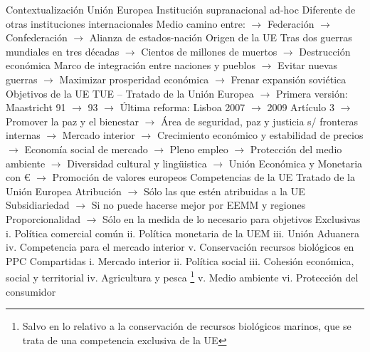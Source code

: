 \documentclass{nuevotema}
\begin{document}
\esquemalargo















\begin{esquemal}
	\1[] 
		\2 Contextualización
			\3 Unión Europea
				\4 Institución supranacional ad-hoc
				\4[] Diferente de otras instituciones internacionales
				\4[] Medio camino entre:
				\4[] $\to$ Federación
				\4[] $\to$ Confederación
				\4[] $\to$ Alianza de estados-nación
				\4 Origen de la UE
				\4[] Tras dos guerras mundiales en tres décadas
				\4[] $\to$ Cientos de millones de muertos
				\4[] $\to$ Destrucción económica
				\4[] Marco de integración entre naciones y pueblos
				\4[] $\to$ Evitar nuevas guerras
				\4[] $\to$ Maximizar prosperidad económica
				\4[] $\to$ Frenar expansión soviética
				\4 Objetivos de la UE
				\4[] TUE -- Tratado de la Unión Europea
				\4[] $\to$ Primera versión: Maastricht 91 $\to$ 93
				\4[] $\to$ Última reforma: Lisboa 2007 $\to$ 2009
				\4[] Artículo 3
				\4[] $\to$ Promover la paz y el bienestar
				\4[] $\to$ Área de seguridad, paz y justicia s/ fronteras internas
				\4[] $\to$ Mercado interior
				\4[] $\to$ Crecimiento económico y estabilidad de precios
				\4[] $\to$ Economía social de mercado
				\4[] $\to$ Pleno empleo
				\4[] $\to$ Protección del medio ambiente
				\4[] $\to$ Diversidad cultural y lingüistica
				\4[] $\to$ Unión Económica y Monetaria con €
				\4[] $\to$ Promoción de valores europeos
			\3 Competencias de la UE
				\4 Tratado de la Unión Europea
				\4[] Atribución
				\4[] $\to$ Sólo las que estén atribuidas a la UE
				\4[] Subsidiariedad
				\4[] $\to$ Si no puede hacerse mejor por EEMM y regiones
				\4[] Proporcionalidad
				\4[] $\to$ Sólo en la medida de lo necesario para objetivos
				\4 Exclusivas
				\4[] i. Política comercial común
				\4[] ii. Política monetaria de la UEM
				\4[] iii. Unión Aduanera
				\4[] iv. Competencia para el mercado interior
				\4[] v. Conservación recursos biológicos en PPC
				\4 Compartidas
				\4[] i. Mercado interior
				\4[] ii. Política social
				\4[] iii. Cohesión económica, social y territorial
				\4[] iv. Agricultura y pesca \footnote{Salvo en lo relativo a la conservación de recursos biológicos marinos, que se trata de una competencia exclusiva de la UE}
				\4[] v. Medio ambiente
				\4[] vi. Protección del consumidor

\end{esquemal}
\end{document}
